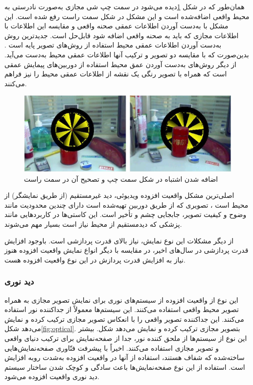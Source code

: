 همان‌طور که در شکل \ref{fig:Tian}دیده می‌شود در سمت چپ شی مجازی به‌صورت نادرستی به محیط واقعی اضافه‌شده است و این مشکل در شکل سمت راست رفع شده است. این مشکل با به‌دست آوردن اطلاعات عمقی صحنه واقعی و مقایسه این اطلاعات با اطلاعات مجازی که باید به صحنه واقعی اضافه شود قابل‌حل است. جدیدترین روش به‌دست آوردن اطلاعات عمقی محیط استفاده از روش‌های تصویر پایه است \cite{Billinghurst}.
بدین‌صورت که با مقایسه دو تصویر و ترکیب آنها اطلاعات عمقی محیط به‌دست می‌آید. از دیگر روش‌های به‌دست آوردن عمق محیط استفاده از دوربین‌های پیمایش عمقی است که همراه با تصویر رنگی یک نقشه از اطلاعات عمقی محیط را نیز فراهم می‌کنند.
\begin{figure}
	\centering
	\includegraphics[width=1\linewidth]{image/wrongpic}
	\caption {اضافه شدن اشتباه در شکل سمت چپ و تصحیح آن در سمت راست \cite{Tian}}
	\label{fig:Tian}
\end{figure}


اصلی‌ترین مشکل واقعیت افزوده ویدیوئی، دید غیرمستقیم (از طریق نمایشگر) از محیط است \cite{Billinghurst}، تصویری که از طریق دوربین تهیه‌شده است دارای چندین محدودیت مانند وضوح و کیفیت تصویر، جابجایی چشم و تأخیر است. این کاستی‌ها در کاربردهایی مانند پزشکی که دیدمستقیم از محیط نیاز است بسیار مهم می‌شوند.

از دیگر مشکلات این نوع نمایش، نیاز بالای قدرت پردازشی است. باوجود افزایش قدرت پردازشی در سال‌های اخیر، در مقایسه با دیگر انواع نمایش واقعیت افزوده هنوز نیاز به افزایش قدرت پردازش در این نوع واقعیت افزوده هست.

\subsubsection{دید نوری}
این نوع از واقعیت افزوده از سیستم‌های نوری برای نمایش تصویر مجازی به همراه تصویر محیط واقعی استفاده می‌کنند. این سیستم‌ها معمولاً از جداکننده نور استفاده می‌کنند. این جداکننده تصویر واقعی را با انعکاس تصویر مجازی ترکیب کرده و نمایش می‌دهد شکل\ref{fig:optical}. بتصویر مجازی ترکیب کرده و نمایش می‌دهد شکل. بیشتر این نوع از سیستم‌ها از ملحق کننده نور، جدا از صفحه‌نمایش برای ترکیب دنیای واقعی و تصویر مجازی استفاده می‌کنند. اخیراً با پیشرفت فنّاوری صفحه‌نمایش‌هایی ساخته‌شده که شفاف هستند، استفاده از آنها در واقعیت افزوده به‌شدت روبه افزایش است. استفاده از این نوع صفحه‌نمایش‌ها باعث سادگی و کوچک شدن ساختار سیستم دید نوری واقعیت افزوده می‌شود\cite{Billinghurst}.

